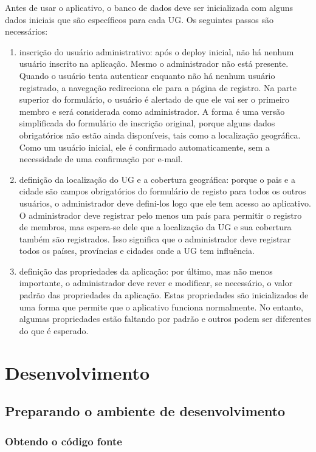 \documentclass[envcountsame,envcountchap,letterpaper]{svmono}
\begin{document}
Antes de usar o aplicativo, o banco de dados deve ser inicializada com alguns dados iniciais que são específicos para cada UG. Os seguintes passos são necessários:

\begin{enumerate}
\item inscrição do usuário administrativo: após o deploy inicial, não há nenhum usuário inscrito na aplicação. Mesmo o administrador não está presente. Quando o usuário tenta autenticar enquanto não há nenhum usuário registrado, a navegação redireciona ele para a página de registro. Na parte superior do formulário, o usuário é alertado de que ele vai ser o primeiro membro e será considerada como administrador. A forma é uma versão simplificada do formulário de inscrição original, porque alguns dados obrigatórios não estão ainda disponíveis, tais como a localização geográfica. Como um usuário inicial, ele é confirmado automaticamente, sem a necessidade de uma confirmação por e-mail.
\item definição da localização do UG e a cobertura geográfica: porque o pais e a cidade são campos obrigatórios do formulário de registo para todos os outros usuários, o administrador deve defini-los logo que ele tem acesso ao aplicativo. O administrador deve registrar pelo menos um país para permitir o registro de membros, mas espera-se dele que a localização da UG e sua cobertura também são registrados. Isso significa que o administrador deve registrar todos os países, províncias e cidades onde a UG tem influência.
\item definição das propriedades da aplicação: por último, mas não menos importante, o administrador deve rever e modificar, se necessário, o valor padrão das propriedades da aplicação. Estas propriedades são inicializados de uma forma que permite que o aplicativo funciona normalmente. No entanto, algumas propriedades estão faltando por padrão e outros podem ser diferentes do que é esperado.
\end{enumerate}

\chapter{Desenvolvimento}

\section{Preparando o ambiente de desenvolvimento}

\subsection{Obtendo o código fonte}
\label{ssec:obtaining-source-code}
\end{document}
